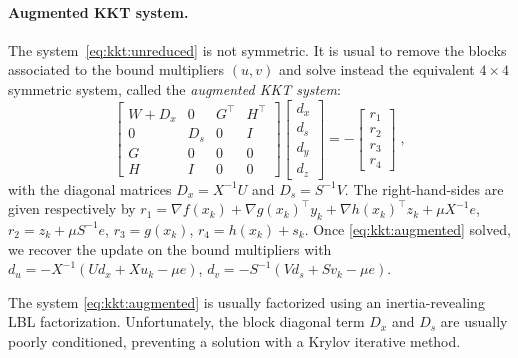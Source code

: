 \paragraph{Augmented KKT system.}
The system~\eqref{eq:kkt:unreduced} is not symmetric.
It is usual to remove the blocks associated
to the bound multipliers $(u, v)$ and solve instead the equivalent
$4 \times 4$ symmetric system, called the \emph{augmented KKT system}:
\begin{equation}
  \label{eq:kkt:augmented}
  \tag{$K_2$}
  \begin{bmatrix}
    W + D_x & 0 & G^\top & H^\top \\
    0 & D_s & 0& I \\
    G & 0 & 0 & 0 \\
    H & I & 0 & 0
  \end{bmatrix}
  \begin{bmatrix}
    d_x \\
    d_s \\
    d_y \\
    d_z
  \end{bmatrix}
  = - \begin{bmatrix}
    r_1 \\ r_2 \\ r_3 \\ r_4
  \end{bmatrix} \; ,
\end{equation}
with the diagonal matrices $D_x = X^{-1} U$ and $D_s = S^{-1} V$.
The right-hand-sides are given respectively by
$r_1 = \nabla f(x_k) + \nabla g(x_k)^\top y_k + \nabla h(x_k)^\top z_k + \mu X^{-1} e$,
$r_2 = z_k + \mu S^{-1} e$,
$r_3 = g(x_k)$,
$r_4 = h(x_k) + s_k$.
Once \eqref{eq:kkt:augmented} solved, we recover the
update on the bound multipliers with
$d_u = - X^{-1}(U d_x + X u_k - \mu e)$,
$d_v = - S^{-1}(V d_s + S v_k - \mu e)$.

The system \eqref{eq:kkt:augmented} is usually factorized using
an inertia-revealing LBL factorization.
Unfortunately, the block diagonal term
$D_x$ and $D_s$ are usually poorly conditioned, preventing
a solution with a Krylov iterative method.

